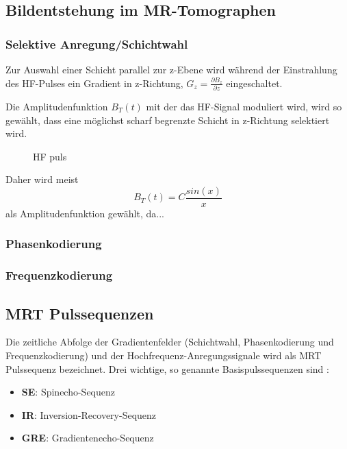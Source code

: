 \subsection{Bildentstehung im MR-Tomographen}

\subsubsection{Selektive Anregung/Schichtwahl}
Zur Auswahl einer Schicht parallel zur z-Ebene wird während der Einstrahlung des HF-Pulses ein Gradient in z-Richtung, $G_z=\frac{\partial B_z}{\partial z}$ eingeschaltet.

Die Amplitudenfunktion $B_T(t)$ mit der das HF-Signal moduliert wird, wird so gewählt, dass eine möglichst scharf begrenzte Schicht in z-Richtung selektiert wird.

\begin{figure}[H]
	\centering
	\caption[form]{HF puls}
	\label{fig:rfForm}
\end{figure}

Daher wird meist
\begin{equation}
	B_T(t)=C \frac{sin(x)}{x}
\end{equation}
als Amplitudenfunktion gewählt, da...


\subsubsection{Phasenkodierung}

\subsubsection{Frequenzkodierung}

\subsection{MRT Pulssequenzen}
Die zeitliche Abfolge der Gradientenfelder (Schichtwahl, Phasenkodierung und Frequenzkodierung) und der Hochfrequenz-Anregungssignale wird als MRT Pulssequenz bezeichnet.
Drei wichtige, so genannte Basispulssequenzen sind \cite[S. 999]{Weishaupt2014}:
\begin{itemize}
	\item \textbf{SE}: Spinecho-Sequenz
	\item \textbf{IR}: Inversion-Recovery-Sequenz
	\item \textbf{GRE}: Gradientenecho-Sequenz
\end{itemize}



